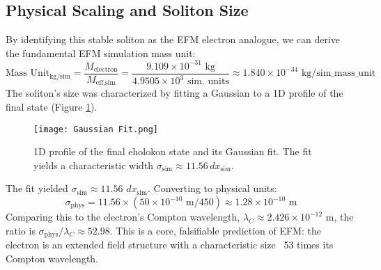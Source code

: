 \documentclass[11pt]{article}
\begin{document}
\subsection{Physical Scaling and Soliton Size}
By identifying this stable soliton as the EFM electron analogue, we can derive the fundamental EFM simulation mass unit:
\[
\text{Mass Unit}_{\text{kg/sim}} = \frac{M_{\text{electron}}}{M_{\text{eff,sim}}} = \frac{9.109 \times 10^{-31} \text{ kg}}{4.9505 \times 10^3 \text{ sim. units}} \approx 1.840 \times 10^{-34} \text{ kg/sim\_mass\_unit}
\]
The soliton's size was characterized by fitting a Gaussian to a 1D profile of the final state (Figure \ref{fig:ehokolon_profile_fit}).
\begin{figure}[htbp]
    \centering
    \texttt{[image: Gaussian Fit.png]} %
    \caption{1D profile of the final eholokon state and its Gaussian fit. The fit yields a characteristic width \(\sigma_{\text{sim}} \approx 11.56 \, dx_{\text{sim}}\).}
    \label{fig:ehokolon_profile_fit}
\end{figure}
The fit yielded \(\sigma_{\text{sim}} \approx 11.56\) \(dx_{\text{sim}}\). Converting to physical units:
\[
\sigma_{\text{phys}} = 11.56 \times (50 \times 10^{-10} \text{ m} / 450) \approx 1.28 \times 10^{-10} \text{ m}
\]
Comparing this to the electron's Compton wavelength, \(\lambda_C \approx 2.426 \times 10^{-12}\) m, the ratio is \(\sigma_{\text{phys}} / \lambda_C \approx 52.98\). This is a core, falsifiable prediction of EFM: the electron is an extended field structure with a characteristic size ~53 times its Compton wavelength.
\end{document}
